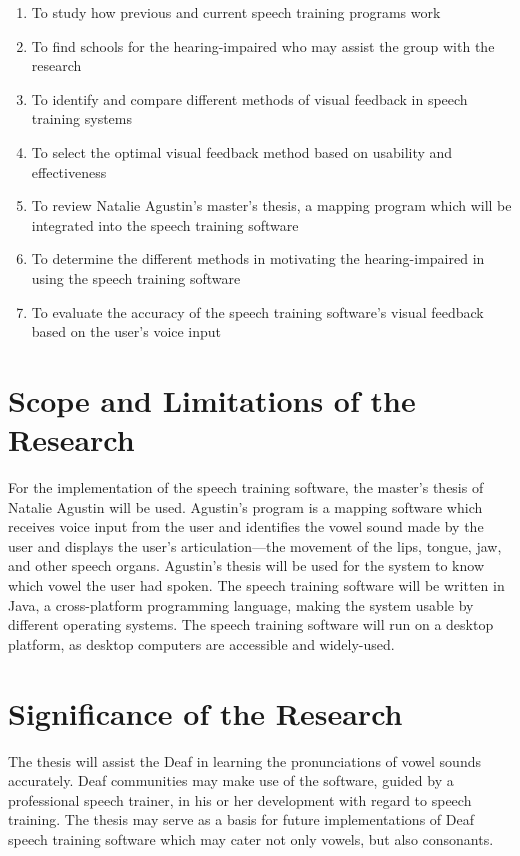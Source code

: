 \begin{enumerate}
\item To study how previous and current speech training programs work
\item To find schools for the hearing-impaired who may assist the group with the research
\item To identify and compare different methods of visual feedback in speech training systems
\item To select the optimal visual feedback method based on usability and effectiveness
\item To review Natalie Agustin's \citeyear{agustin:2014:SOM} master's thesis, a mapping program which will be integrated into the speech training software
\item To determine the different methods in motivating the hearing-impaired in using the speech training software
\item To evaluate the accuracy of the speech training software's visual feedback based on the user's voice input
\end{enumerate}

\section{Scope and Limitations of the Research}
\label{sec:scopelimitations}

For the implementation of the speech training software, the master's thesis of Natalie Agustin \citeyear{agustin:2014:SOM} will be used. Agustin's program is a mapping software which receives voice input from the user and identifies the vowel sound made by the user and displays the user’s articulation—the movement of the lips, tongue, jaw, and other speech organs. Agustin's thesis will be used for the system to know which vowel the user had spoken.
The speech training software will be written in Java, a cross-platform programming language, making the system usable by different operating systems.
The speech training software will run on a desktop platform, as desktop computers are accessible and widely-used.

\section{Significance of the Research}
\label{sec:significance}

The thesis will assist the Deaf in learning the pronunciations of vowel sounds accurately. Deaf communities may make use of the software, guided by a professional speech trainer, in his or her development with regard to speech training.
The thesis may serve as a basis for future implementations of Deaf speech training software which may cater not only vowels, but also consonants.